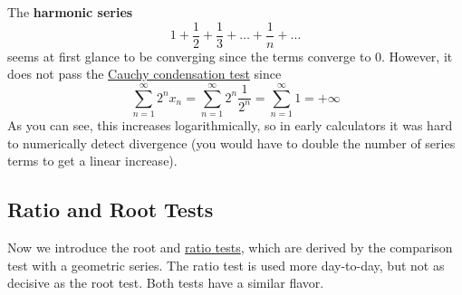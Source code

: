   \begin{example}
    \label{ex:harmonic-series}
    The \textbf{harmonic series} 
    \begin{equation}
      1 + \frac{1}{2} + \frac{1}{3} + \ldots + \frac{1}{n} + \ldots
    \end{equation}
    seems at first glance to be converging since the terms converge to $0$. However, it does not pass the \hyperref[thm:cauchy-condensation-test]{Cauchy condensation test} since 
    \begin{equation}
      \sum_{n=1}^\infty 2^n x_n = \sum_{n=1}^\infty 2^n \frac{1}{2^n} = \sum_{n=1}^\infty 1 = +\infty
    \end{equation}
    As you can see, this increases logarithmically, so in early calculators it was hard to numerically detect divergence (you would have to double the number of series terms to get a linear increase). 
  \end{example} 

\subsection{Ratio and Root Tests} 

  Now we introduce the root and \hyperref[thm:ratio-test]{ratio tests}, which are derived by the comparison test with a geometric series. The ratio test is used more day-to-day, but not as decisive as the root test. Both tests have a similar flavor. 

